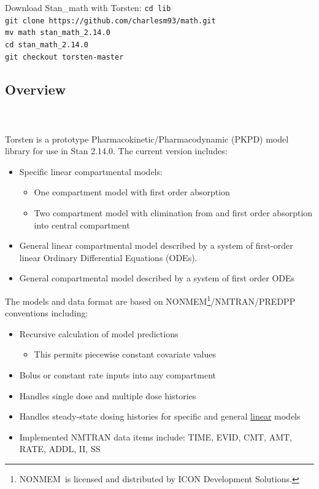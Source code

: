 \documentclass[11pt]{amsart}
\begin{document}
Download Stan\_math with Torsten:
\texttt{cd lib \\
git clone https://github.com/charlesm93/math.git \\
mv math stan\_math\_2.14.0 \\
cd stan\_math\_2.14.0 \\
git checkout torsten-master
}

\subsection{Overview} \ \\ \ \\
Torsten is a prototype Pharmacokinetic/Pharmacodynamic (PKPD) model library for use in Stan 2.14.0. The current version includes:
\begin{itemize}
  \item Specific linear compartmental models:
  \begin{itemize}
    \item One compartment model with first order absorption
    \item Two compartment model with elimination from and first order absorption into central compartment
  \end{itemize}
  \item General linear compartmental model described by a system of first-order linear Ordinary Differential Equations (ODEs).
  \item General compartmental model described by a system of first order ODEs 
 \end{itemize}

The models and data format are based on NONMEM\textregistered\footnote{NONMEM\textregistered\ is licensed and distributed by ICON Development Solutions.}/NMTRAN/PREDPP conventions including:
\begin{itemize}
  \item Recursive calculation of model predictions
  \begin{itemize}
    \item This permits piecewise constant covariate values
  \end{itemize}
  \item Bolus or constant rate inputs into any compartment
  \item Handles single dose and multiple dose histories
  \item Handles steady-state dosing histories for specific and general \underline{linear} models
  \item Implemented NMTRAN data items include: TIME, EVID, CMT, AMT, RATE, ADDL, II, SS
\end{itemize}
\end{document}

